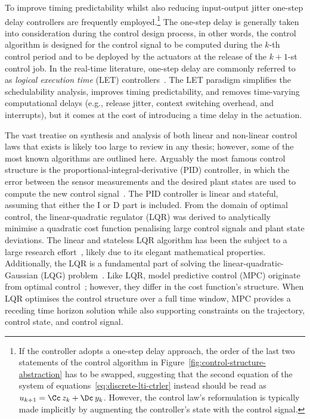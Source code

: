 To improve timing predictability whilst also reducing input-output jitter one-step delay controllers are frequently employed.\footnote{If the controller adopts a one-step delay approach, the order of the last two statements of the control algorithm in Figure~\ref{fig:control-structure-abstraction} has to be swapped, suggesting that the second equation of the system of equations~\eqref{eq:discrete-lti-ctrler} instead should be read as $u_{k+1} = \Cc\,z_k+\Dc\,y_k$. However, the control law's reformulation is typically made implicitly by augmenting the controller's state with the control signal.}
The one-step delay is generally taken into consideration during the control design process, in other words, the control algorithm is designed for the control signal to be computed during the $k$-th control period and to be deployed by the actuators at the release of the $k+1$-st control job.
In the real-time literature, one-step delay are commonly referred to as \emph{logical execution time} (LET) controllers~\cite{Ernst:2018, Gemlau:2021, Kirsch:2012}.
The LET paradigm simplifies the schedulability analysis, improves timing predictability, and removes time-varying computational delays (e.g., release jitter, context switching overhead, and interrupts), but it comes at the cost of introducing a time delay in the actuation.

The vast treatise on synthesis and analysis of both linear and non-linear control laws that exists is likely too large to review in any thesis; however, some of the most known algorithms are outlined here.
Arguably the most famous control structure is the proportional-integral-derivative (PID) controller, in which the error between the sensor measurements and the desired plant states are used to compute the new control signal~\cite{Astrom:2006}.
The PID controller is linear and stateful, assuming that either the I or D part is included.
From the domain of optimal control, the linear-quadratic regulator (LQR) was derived to analytically minimise a quadratic cost function penalising large control signals and plant state deviations.
The linear and stateless LQR algorithm has been the subject to a large research effort~\cite{Goswami:2012, Linsenmayer:2018}, likely due to its elegant mathematical properties.
Additionally, the LQR is a fundamental part of solving the linear-quadratic-Gaussian (LQG) problem~\cite{Astrom:1997}.
Like LQR, model predictive control (MPC) originate from optimal control~\cite{Allgower:1999}; however, they differ in the cost function's structure.
When LQR optimises the control structure over a full time window, MPC provides a receding time horizon solution while also supporting constraints on the trajectory, control state, and control signal.

